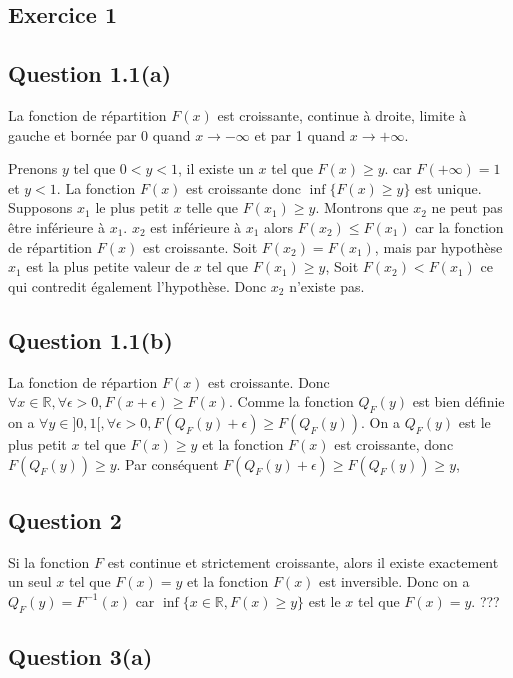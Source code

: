 \documentclass[]{book}
\theoremstyle{definition}
\newcommand{\bb}[1]{\mathbb{#1}}
\newcommand{\R}{\bb{R}}
\begin{document}
\subsection*{Exercice 1}
\subsection*{Question 1.1(a)}
La fonction de r\'epartition $F(x)$ est croissante, continue \`a droite, limite \`a gauche et born\'ee par 0 quand $x \to -\infty$ et par 1 quand $x \to +\infty$. 

Prenons $y$ tel que $0<y<1$, il existe un $x$ tel que $F(x) \geq y$. car $F(+\infty) = 1$ et $y < 1$. La fonction $F(x)$ est croissante donc $\inf\{ F(x) \geq y\}$ est unique. Supposons $x_1$ le plus petit $x$ telle que $F(x_1) \geq y$. Montrons que $x_2$ ne peut pas \^etre inf\'erieure \`a $x_1$. $x_2$ est inf\'erieure \`a $x_1$ alors $F(x_2) \leq F(x_1)$ car la fonction de r\'epartition $F(x)$ est croissante. Soit $F(x_2) = F(x_1)$, mais par hypoth\`ese $x_1$ est la plus petite valeur de $x$ tel que $F(x_1) \geq y$, Soit $F(x_2) < F(x_1)$ ce qui contredit \'egalement l'hypoth\`ese. Donc $x_2$ n'existe pas. 


\subsection*{Question 1.1(b)}
La fonction de r\'epartion $F(x)$ est croissante. Donc $\forall x \in \R, \forall \epsilon > 0, F(x + \epsilon) \geq F(x)$. Comme la fonction $Q_F(y)$ est bien d\'efinie on a $\forall y \in ]0,1[, \forall \epsilon > 0, F(Q_F(y) + \epsilon) \geq F(Q_F(y))$. On a $Q_F(y)$ est le plus petit $x$ tel que $F(x) \geq y$ et la fonction $F(x)$ est croissante, donc $F(Q_F(y)) \geq y$. Par cons\'equent $F(Q_F(y) + \epsilon) \geq F(Q_F(y)) \geq y$,   


\subsection*{Question 2}
Si la fonction $F$ est continue et strictement croissante, alors il existe exactement un seul $x$ tel que $F(x) = y$ et la fonction $F(x)$ est inversible. Donc on a $Q_F(y) = F^{-1}(x)$ car $\inf\{x \in \R, F(x) \geq y\}$ est le $x$ tel que $F(x) = y$. ???

\subsection*{Question 3(a)}
\end{document}
